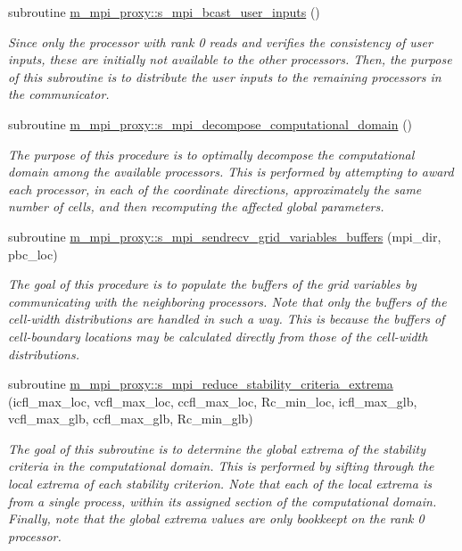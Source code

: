 \begin{DoxyCompactItemize}
subroutine \hyperlink{namespacem__mpi__proxy_a69660c5fe9302a8c0496b622fa3b5286}{m\+\_\+mpi\+\_\+proxy\+::s\+\_\+mpi\+\_\+bcast\+\_\+user\+\_\+inputs} ()
\begin{DoxyCompactList}\small\item\em Since only the processor with rank 0 reads and verifies the consistency of user inputs, these are initially not available to the other processors. Then, the purpose of this subroutine is to distribute the user inputs to the remaining processors in the communicator. \end{DoxyCompactList}\item 
subroutine \hyperlink{namespacem__mpi__proxy_a80c5e235786545276fe6ffa06965017f}{m\+\_\+mpi\+\_\+proxy\+::s\+\_\+mpi\+\_\+decompose\+\_\+computational\+\_\+domain} ()
\begin{DoxyCompactList}\small\item\em The purpose of this procedure is to optimally decompose the computational domain among the available processors. This is performed by attempting to award each processor, in each of the coordinate directions, approximately the same number of cells, and then recomputing the affected global parameters. \end{DoxyCompactList}\item 
subroutine \hyperlink{namespacem__mpi__proxy_ac348cb6f02f2a9ab70d5c7eac6320231}{m\+\_\+mpi\+\_\+proxy\+::s\+\_\+mpi\+\_\+sendrecv\+\_\+grid\+\_\+variables\+\_\+buffers} (mpi\+\_\+dir, pbc\+\_\+loc)
\begin{DoxyCompactList}\small\item\em The goal of this procedure is to populate the buffers of the grid variables by communicating with the neighboring processors. Note that only the buffers of the cell-\/width distributions are handled in such a way. This is because the buffers of cell-\/boundary locations may be calculated directly from those of the cell-\/width distributions. \end{DoxyCompactList}\item 
subroutine \hyperlink{namespacem__mpi__proxy_a340a2c9b1688582ee485dd5d9bbcc864}{m\+\_\+mpi\+\_\+proxy\+::s\+\_\+mpi\+\_\+reduce\+\_\+stability\+\_\+criteria\+\_\+extrema} (icfl\+\_\+max\+\_\+loc, vcfl\+\_\+max\+\_\+loc, ccfl\+\_\+max\+\_\+loc, Rc\+\_\+min\+\_\+loc, icfl\+\_\+max\+\_\+glb, vcfl\+\_\+max\+\_\+glb, ccfl\+\_\+max\+\_\+glb, Rc\+\_\+min\+\_\+glb)
\begin{DoxyCompactList}\small\item\em The goal of this subroutine is to determine the global extrema of the stability criteria in the computational domain. This is performed by sifting through the local extrema of each stability criterion. Note that each of the local extrema is from a single process, within its assigned section of the computational domain. Finally, note that the global extrema values are only bookkeept on the rank 0 processor. \end{DoxyCompactList}\item 

\end{DoxyCompactItemize}

